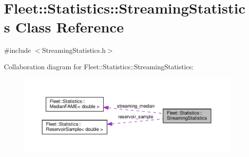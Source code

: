 \hypertarget{class_fleet_1_1_statistics_1_1_streaming_statistics}{}\section{Fleet\+:\+:Statistics\+:\+:Streaming\+Statistics Class Reference}
\label{class_fleet_1_1_statistics_1_1_streaming_statistics}


{\ttfamily \#include $<$Streaming\+Statistics.\+h$>$}



Collaboration diagram for Fleet\+:\+:Statistics\+:\+:Streaming\+Statistics\+:\nopagebreak
\begin{figure}[H]
\begin{center}
\leavevmode
\includegraphics[width=350pt]{class_fleet_1_1_statistics_1_1_streaming_statistics__coll__graph}
\end{center}
\end{figure}
